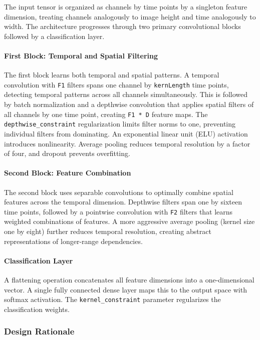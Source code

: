 \documentclass[12pt]{report}
\begin{document}
The input tensor is organized as channels by time points by a singleton feature dimension, treating channels analogously to image height and time analogously to width. The architecture progresses through two primary convolutional blocks followed by a classification layer.

\paragraph{First Block: Temporal and Spatial Filtering}\mbox{}

The first block learns both temporal and spatial patterns. A temporal convolution with \verb|F1| filters spans one channel by \verb|kernLength| time points, detecting temporal patterns across all channels simultaneously. This is followed by batch normalization and a depthwise convolution that applies spatial filters of all channels by one time point, creating \verb|F1 * D| feature maps. The \verb|depthwise_constraint| regularization limits filter norms to one, preventing individual filters from dominating. An exponential linear unit (ELU) activation introduces nonlinearity. Average pooling reduces temporal resolution by a factor of four, and dropout prevents overfitting.

\paragraph{Second Block: Feature Combination}\mbox{}

The second block uses separable convolutions to optimally combine spatial features across the temporal dimension. Depthwise filters span one by sixteen time points, followed by a pointwise convolution with \verb|F2| filters that learns weighted combinations of features. A more aggressive average pooling (kernel size one by eight) further reduces temporal resolution, creating abstract representations of longer-range dependencies.

\paragraph{Classification Layer}\mbox{}

A flattening operation concatenates all feature dimensions into a one-dimensional vector. A single fully connected dense layer maps this to the output space with softmax activation. The \verb|kernel_constraint| parameter regularizes the classification weights.

\subsubsection{Design Rationale}
\end{document}
